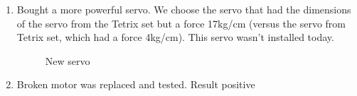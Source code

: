 \begin{enumerate}
\begin{enumerate}
	  \item Bought a more powerful servo. We choose the servo that had the dimensions of the servo from the Tetrix set but a force 17kg/cm (versus the servo from Tetrix set, which had a force 4kg/cm). This servo wasn't installed today. 
	  \begin{figure}[H]
	  	\begin{minipage}[h]{1\linewidth}
	  		\caption{New servo}
	  	\end{minipage}
	  \end{figure}
	  	
	  \item Broken motor was replaced and tested. Result positive
	  

\end{enumerate}
\end{enumerate}
